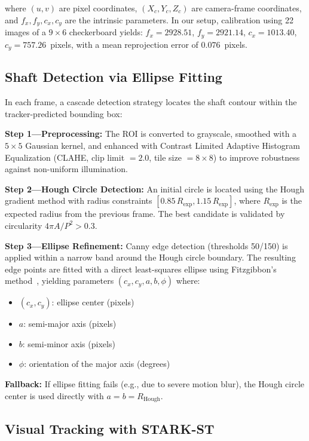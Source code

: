 \documentclass[journal]{IEEEtran}
\begin{document}
where $(u,v)$ are pixel coordinates, $(X_c,Y_c,Z_c)$ are camera-frame coordinates,
and $f_x,f_y,c_x,c_y$ are the intrinsic parameters. In our setup, calibration
using 22 images of a $9\times 6$ checkerboard yields: $f_x = 2928.51$,
$f_y = 2921.14$, $c_x = 1013.40$, $c_y = 757.26$~pixels, with a mean
reprojection error of $0.076$~pixels.

\subsection{Shaft Detection via Ellipse Fitting}

In each frame, a cascade detection strategy locates the shaft contour within the
tracker-predicted bounding box:

\textbf{Step 1---Preprocessing:} The ROI is converted to grayscale, smoothed
with a $5\times 5$ Gaussian kernel, and enhanced with Contrast Limited Adaptive
Histogram Equalization (CLAHE, clip limit $=2.0$, tile size $=8\times 8$) to
improve robustness against non-uniform illumination.

\textbf{Step 2---Hough Circle Detection:} An initial circle is located using
the Hough gradient method with radius constraints $[0.85\,R_{\text{exp}},
1.15\,R_{\text{exp}}]$, where $R_{\text{exp}}$ is the expected radius from
the previous frame. The best candidate is validated by circularity
$4\pi A / P^{2} > 0.3$.

\textbf{Step 3---Ellipse Refinement:} Canny edge detection (thresholds
50/150) is applied within a narrow band around the Hough circle boundary.
The resulting edge points are fitted with a direct least-squares ellipse
using Fitzgibbon's method~\cite{fitzgibbon1999}, yielding parameters
$(c_x, c_y, a, b, \phi)$ where:
\begin{itemize}
\item $(c_x, c_y)$: ellipse center (pixels)
\item $a$: semi-major axis (pixels)
\item $b$: semi-minor axis (pixels)
\item $\phi$: orientation of the major axis (degrees)
\end{itemize}

\textbf{Fallback:} If ellipse fitting fails (e.g., due to severe motion blur),
the Hough circle center is used directly with $a = b = R_{\text{Hough}}$.

\subsection{Visual Tracking with STARK-ST}
\end{document}
